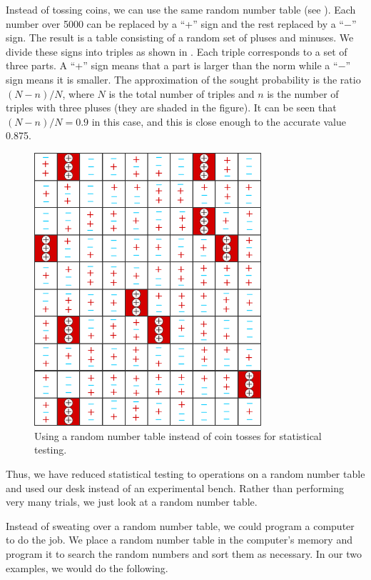  Instead of tossing coins, we can use the same random
number table (see ). Each number over \num{5000} can be replaced by a ``+'' sign and the rest replaced by a ``$-$'' sign. The result is a table
consisting of a random set of pluses and minuses. We divide these signs
into triples as shown in . Each triple corresponds to a set of three parts. A ``+'' sign means that a part is larger than the norm while
a ``$-$'' sign means it is smaller. The approximation of the sought
probability is the ratio $(N - n)/N$, where $N$ is the total number of triples
and $n$ is the number of triples with three pluses (they are shaded in the
figure). It can be seen that $(N - n)/N = 0.9$ in this case, and this is close
enough to the accurate value 0.875.
 \begin{figure}[!h]
 \centering
 \includegraphics[width=0.75\textwidth]{figures/monte-carlo3.pdf}
\caption{Using a random number table instead of coin tosses for statistical testing.\label{monte-carlo3}}
 \end{figure}

Thus, we have reduced statistical testing to operations on a random
number table and used our desk instead of an experimental bench.
Rather than performing very many trials, we just look at a random
number table.

 Instead of sweating over a random
number table, we could program a computer to do the job. We place
a random number table in the computer's memory and program it to
search the random numbers and sort them as necessary. In our two
examples, we would do the following.

